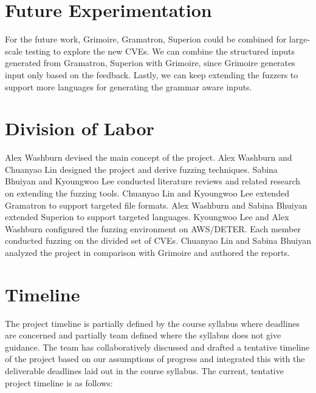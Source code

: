 \documentclass[12pt]{diazessay}
\begin{document}
\section*{Future Experimentation}
For the future work, Grimoire, Gramatron, Superion could be combined for large-scale testing to explore the new CVEs. 
We can combine the structured inputs generated from Gramatron, Superion with Grimoire, since Grimoire generates input only based on the feedback.
Lastly, we can keep extending the fuzzers to support more languages for generating the grammar aware inputs.


\clearpage

\section*{Division of Labor}

Alex Washburn devised the main concept of the project.
Alex Washburn and Chuanyao Lin designed the project and derive fuzzing techniques.
Sabina Bhuiyan and Kyoungwoo Lee conducted literature reviews and related research on extending the fuzzing tools.
Chuanyao Lin and Kyoungwoo Lee extended Gramatron to support targeted file formats.
Alex Washburn and Sabina Bhuiyan extended Superion to support targeted languages.
Kyoungwoo Lee and Alex Washburn configured the fuzzing environment on AWS/DETER.
Each member conducted fuzzing on the divided set of CVEs.
Chuanyao Lin and Sabina Bhuiyan analyzed the project in comparison with Grimoire and authored the reports.


\section*{Timeline}

The project timeline is partially defined by the course syllabus where deadlines are concerned
and partially team defined where the syllabus does not give guidance.
The team has collaboratively discussed and drafted a tentative timeline of the project based on our assumptions of progress and integrated this with the deliverable deadlines laid out in the course syllabus. The current, tentative project timeline is as follows:
\end{document}
